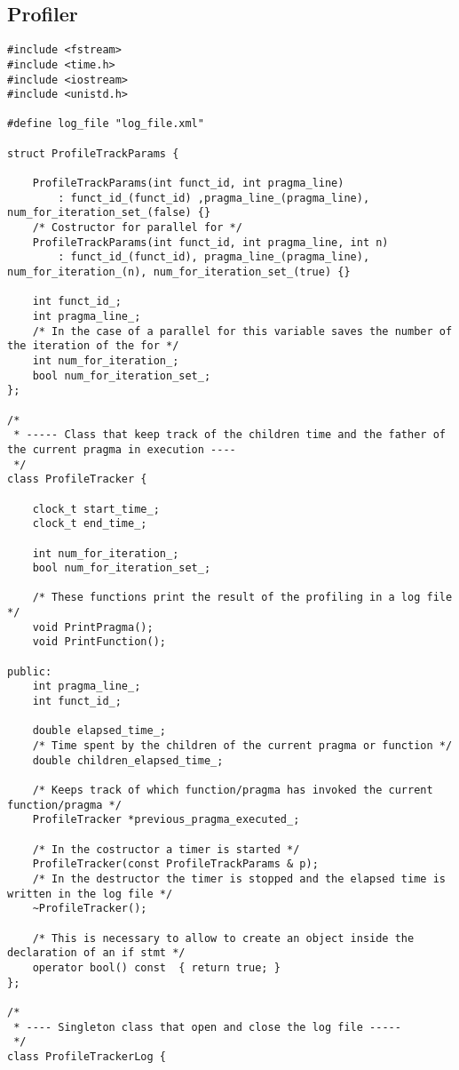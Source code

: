 \documentclass[a4paper,11pt,twoside]{book}
\begin{document}
\subsection{Profiler}
\begin{lstlisting}[language=CCC, caption=profile\_tracker.h]
#include <fstream>
#include <time.h>     
#include <iostream>
#include <unistd.h>

#define log_file "log_file.xml"

struct ProfileTrackParams {

	ProfileTrackParams(int funct_id, int pragma_line)
		: funct_id_(funct_id) ,pragma_line_(pragma_line), num_for_iteration_set_(false) {}
	/* Costructor for parallel for */
	ProfileTrackParams(int funct_id, int pragma_line, int n) 
		: funct_id_(funct_id), pragma_line_(pragma_line), num_for_iteration_(n), num_for_iteration_set_(true) {}

	int funct_id_; 
	int pragma_line_;
	/* In the case of a parallel for this variable saves the number of the iteration of the for */
	int num_for_iteration_;
	bool num_for_iteration_set_;
};

/*
 * ----- Class that keep track of the children time and the father of the current pragma in execution ----
 */
class ProfileTracker {

	clock_t start_time_;
	clock_t end_time_;

	int num_for_iteration_;
	bool num_for_iteration_set_;

	/* These functions print the result of the profiling in a log file */
	void PrintPragma();
	void PrintFunction();

public:
	int pragma_line_;
	int funct_id_;

	double elapsed_time_;
	/* Time spent by the children of the current pragma or function */
	double children_elapsed_time_;

	/* Keeps track of which function/pragma has invoked the current function/pragma */
	ProfileTracker *previous_pragma_executed_;

	/* In the costructor a timer is started */
	ProfileTracker(const ProfileTrackParams & p);
	/* In the destructor the timer is stopped and the elapsed time is written in the log file */
	~ProfileTracker();

	/* This is necessary to allow to create an object inside the declaration of an if stmt */
	operator bool() const  { return true; }
};

/*
 * ---- Singleton class that open and close the log file -----
 */
class ProfileTrackerLog {


\end{lstlisting}
\end{document}
